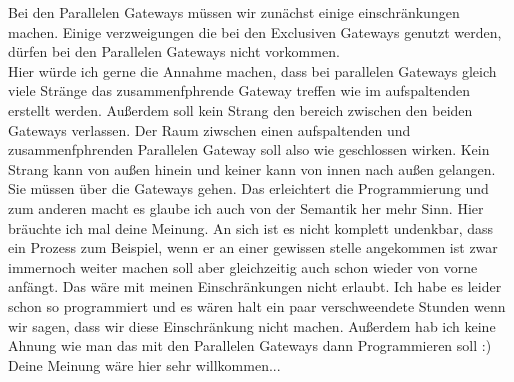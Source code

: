 Bei den Parallelen Gateways müssen wir zunächst einige einschränkungen machen. Einige verzweigungen die bei den Exclusiven Gateways genutzt werden, dürfen bei den Parallelen Gateways nicht vorkommen.\\


Hier würde ich gerne die Annahme machen, dass bei parallelen Gateways gleich viele Stränge das zusammenfphrende Gateway treffen wie im aufspaltenden erstellt werden. Außerdem soll kein Strang den bereich zwischen den beiden Gateways verlassen. Der Raum ziwschen einen aufspaltenden und zusammenfphrenden Parallelen Gateway soll also wie geschlossen wirken. Kein Strang kann von außen hinein und keiner kann von innen nach außen gelangen. Sie müssen über die Gateways gehen. Das erleichtert die Programmierung und zum anderen macht es glaube ich auch von der Semantik her mehr Sinn. Hier bräuchte ich mal deine Meinung. An sich ist es nicht komplett undenkbar, dass ein Prozess zum Beispiel, wenn er an einer gewissen stelle angekommen ist zwar immernoch weiter machen soll aber gleichzeitig auch schon wieder von vorne anfängt. Das wäre mit meinen Einschränkungen nicht erlaubt. Ich habe es leider schon so programmiert und es wären halt ein paar verschweendete Stunden wenn wir sagen, dass wir diese Einschränkung nicht machen. Außerdem hab ich keine Ahnung wie man das mit den Parallelen Gateways dann Programmieren soll :)
Deine Meinung wäre hier sehr willkommen...






